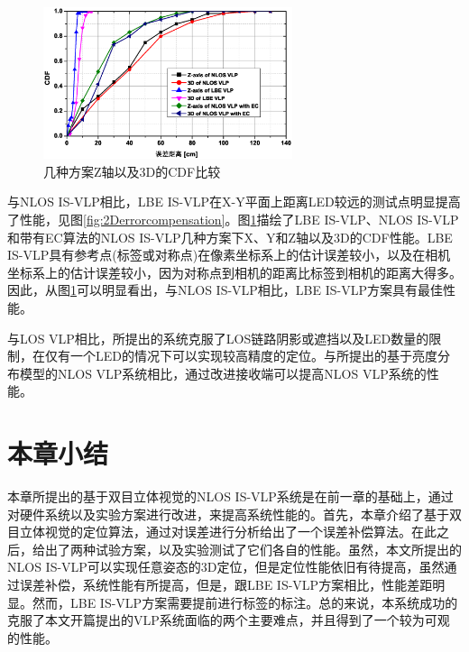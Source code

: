 \begin{figure}[!t]
\centering\includegraphics[width=0.65\textwidth]{FIG/520b.eps}
\caption{几种方案Z轴以及3D的CDF比较}
\label{fig:comparation}
\end{figure}


与NLOS IS-VLP相比，LBE IS-VLP在X-Y平面上距离LED较远的测试点明显提高了性能，见图\ref{fig:2Derrorcompensation}。图\ref{fig:comparation}描绘了LBE IS-VLP、NLOS IS-VLP和带有EC算法的NLOS IS-VLP几种方案下X、Y和Z轴以及3D的CDF性能。LBE IS-VLP具有参考点(标签或对称点)在像素坐标系上的估计误差较小，以及在相机坐标系上的估计误差较小，因为对称点到相机的距离比标签到相机的距离大得多。因此，从图\ref{fig:comparation}可以明显看出，与NLOS IS-VLP相比，LBE IS-VLP方案具有最佳性能。
 
 与LOS VLP相比，所提出的系统克服了LOS链路阴影或遮挡以及LED数量的限制，在仅有一个LED的情况下可以实现较高精度的定位。与所提出的基于亮度分布模型的NLOS VLP系统相比，通过改进接收端可以提高NLOS VLP系统的性能。



\section{本章小结}
 本章所提出的基于双目立体视觉的NLOS IS-VLP系统是在前一章的基础上，通过对硬件系统以及实验方案进行改进，来提高系统性能的。首先，本章介绍了基于双目立体视觉的定位算法，通过对误差进行分析给出了一个误差补偿算法。在此之后，给出了两种试验方案，以及实验测试了它们各自的性能。虽然，本文所提出的NLOS IS-VLP可以实现任意姿态的3D定位，但是定位性能依旧有待提高，虽然通过误差补偿，系统性能有所提高，但是，跟LBE IS-VLP方案相比，性能差距明显。然而，LBE IS-VLP方案需要提前进行标签的标注。总的来说，本系统成功的克服了本文开篇提出的VLP系统面临的两个主要难点，并且得到了一个较为可观的性能。
